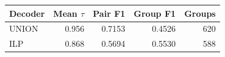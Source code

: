 \begin{tabular}{@{}lrrrr@{}}
\toprule
Decoder & Mean $\tau$ & Pair F1 & Group F1 & Groups \\
\midrule
UNION & 0.956 & 0.7153 & 0.4526 & 620 \\
ILP & 0.868 & 0.5694 & 0.5530 & 588 \\
\bottomrule
\end{tabular}
